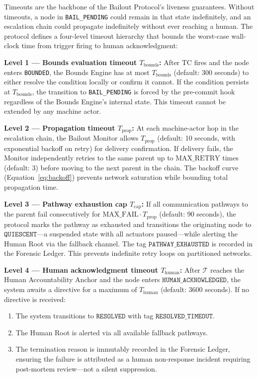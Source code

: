 Timeouts are the backbone of the Bailout Protocol's liveness guarantees. Without
timeouts, a node in \texttt{BAIL\_PENDING} could remain in that state
indefinitely, and an escalation chain could propagate indefinitely without ever
reaching a human. The protocol defines a four-level timeout hierarchy that bounds
the worst-case wall-clock time from trigger firing to human acknowledgment:

\bigskip
\noindent\textbf{Level 1 — Bounds evaluation timeout $T_{\text{bounds}}$:}
After TC fires and the node enters \texttt{BOUNDED}, the Bounds Engine has at
most $T_{\text{bounds}}$ (default: 300 seconds) to either resolve the condition
locally or confirm it cannot. If the condition persists at $T_{\text{bounds}}$,
the transition to \texttt{BAIL\_PENDING} is forced by the \fact{} pre-commit
hook regardless of the Bounds Engine's internal state. This timeout cannot be
extended by any machine actor.

\bigskip
\noindent\textbf{Level 2 — Propagation timeout $T_{\text{prop}}$:}
At each machine-actor hop in the escalation chain, the Bailout Monitor allows
$T_{\text{prop}}$ (default: 10 seconds, with exponential backoff on retry) for
delivery confirmation. If delivery fails, the Monitor independently retries
to the same parent up to $\text{MAX\_RETRY}$ times (default: 3) before moving
to the next parent in the chain. The backoff curve (Equation~\ref{eq:backoff})
prevents network saturation while bounding total propagation time.

\bigskip
\noindent\textbf{Level 3 — Pathway exhaustion cap $T_{\text{cap}}$:}
If all communication pathways to the parent fail consecutively for
$\text{MAX\_FAIL} \cdot T_{\text{prop}}$ (default: 90 seconds), the protocol
marks the pathway as exhausted and transitions the originating node to
$\texttt{QUIESCENT}$—a suspended state with all actuators paused—while
alerting the Human Root via the fallback channel. The tag
$\texttt{PATHWAY\_EXHAUSTED}$ is recorded in the Forensic Ledger. This prevents
indefinite retry loops on partitioned networks.

\bigskip
\noindent\textbf{Level 4 — Human acknowledgment timeout $T_{\text{human}}$:}
After $\mathcal{T}$ reaches the Human Accountability Anchor and the node enters
$\texttt{HUMAN\_ACKNOWLEDGED}$, the system awaits a directive for a maximum of
$T_{\text{human}}$ (default: 3600 seconds). If no directive is received:

\begin{enumerate}\itemsep=0pt
\item The system transitions to $\texttt{RESOLVED}$ with tag
  $\texttt{RESOLVED\_TIMEOUT}$.
\item The Human Root is alerted via all available fallback pathways.
\item The termination reason is immutably recorded in the Forensic Ledger,
  ensuring the failure is attributed as a human non-response incident requiring
  post-mortem review—not a silent suppression.
\end{enumerate}

